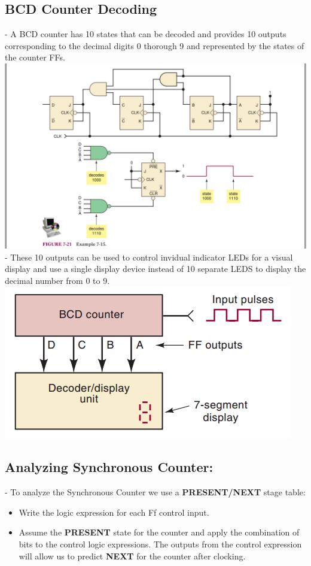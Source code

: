 \documentclass[12pt]{article}
\begin{document}
\subsection{BCD Counter Decoding}
- A BCD counter has 10 states that can be decoded and provides 10 outputs corresponding to the decimal digits 0 thorough 9 and represented by the states of the counter FFs. \\
\includegraphics[scale = 0.8]{hinh60}
\bigbreak
- These 10 outputs can be used to control invidual indicator LEDs for a visual display and use a single display device instead of 10 separate LEDS to display the decimal number from 0 to 9. \\
\includegraphics[scale = 0.7]{hinh61}
\bigbreak

\subsection{Analyzing Synchronous Counter:}
- To analyze the Synchronous Counter we use a \textbf{PRESENT/NEXT} stage table: \\
 \begin{itemize}
     \item Write the logic expression for each Ff control input.
     \item Assume the \textbf{PRESENT} state for the counter and apply the combination of bits to the control logic  expressions. The outputs from the control expression will allow us to predict \textbf{NEXT} for the counter after clocking.
 \end{itemize}
 \bigbreak
\end{document}
